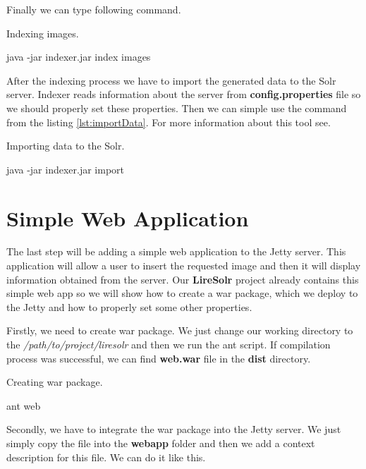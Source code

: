 \documentclass[12pt,a4paper]{report}
\begin{document}
Finally we can type following command.

\begin{listing}[H]
\caption{Indexing images.}
\begin{bashcode}
java -jar indexer.jar index images
\end{bashcode}
\end{listing}

After the indexing process we have to import the generated data to the Solr server. Indexer reads information about the server from \textbf{config.properties} file so we should properly set these properties. Then we can simple use the command from the listing \ref{lst:importData}. For more information about this tool see\cite{indexer}.

\begin{listing}[H]
\caption{Importing data to the Solr.}
\label{lst:importData}
\begin{bashcode}
java -jar indexer.jar import
\end{bashcode}
\end{listing}

\section{Simple Web Application}

The last step will be adding a simple web application to the Jetty server. This application will allow a user to insert the requested image and then it will display information obtained from the server. Our \textbf{LireSolr} project already contains this simple web app so we will show how to create a war package, which we deploy to the Jetty and how to properly set some other properties.

Firstly, we need to create war package. We just change our working directory to the \textit{/path/to/project/liresolr} and then we run the ant script. If compilation process was successful, we can find \textbf{web.war} file in the \textbf{dist} directory.

\begin{listing}[H]
\caption{Creating war package.}
\begin{bashcode}
ant web
\end{bashcode}
\end{listing}

Secondly, we have to integrate the war package into the Jetty server. We just simply copy the file into the \textbf{webapp} folder and then we add a context description for this file. We can do it like this.
\end{document}
